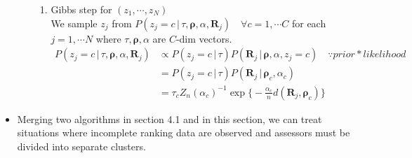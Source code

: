 \documentclass[12pt]{article}
\begin{document}
\begin{itemize}
\begin{itemize}
\begin{enumerate}
            \item Gibbs step for $(z_1, \cdots, z_N)$ \\ We sample $z_j$ from $P(z_j=c \,|\, \tau, \boldsymbol{\rho}, \alpha, \mathbf{R}_j)\quad \forall c=1, \cdots C$ for each $j=1,\cdots N$ where $\tau, \boldsymbol{\rho}, \alpha$ are $C$-dim vectors. \begin{align*}
                P(z_j=c \,|\, \tau, \boldsymbol{\rho}, \alpha, \mathbf{R}_j) &\propto 
                P(z_j=c\, |\, \tau)P(\mathbf{R}_j \, |\, \boldsymbol{\rho}, \alpha, z_j=c) \quad \because prior*likelihood \\ &= P(z_j=c\, |\, \tau)P(\mathbf{R}_j \, |\, \boldsymbol{\rho}_c, \alpha_c) \\ &= \tau_c Z_n(\alpha_c)^{-1}\exp\Big\{-\frac{\alpha_c}{n}d(\mathbf{R}_j, \boldsymbol{\rho}_c)\Big\}
            \end{align*}
        \end{enumerate}
    \end{itemize}
    \item Merging two algorithms in section 4.1 and in this section, we can treat situations where incomplete ranking data are observed and assessors must be divided into separate clusters.
\end{itemize}
\end{document}
